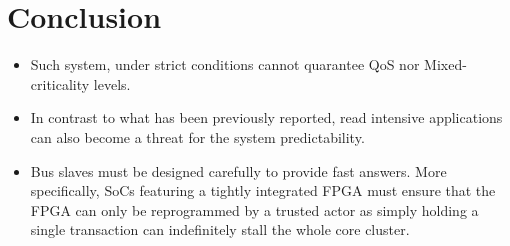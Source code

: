 \section{Conclusion}
    \begin{itemize}
        \item Such system, under strict conditions cannot quarantee QoS nor Mixed-criticality levels.
        \item In contrast to what has been previously reported, read intensive applications can also become a threat for the system predictability.
        \item Bus slaves must be designed carefully to provide fast answers. More specifically, SoCs featuring a tightly integrated FPGA must ensure that the FPGA can only be reprogrammed by a trusted actor as simply holding a single transaction can indefinitely stall the whole core cluster.
    \end{itemize}
